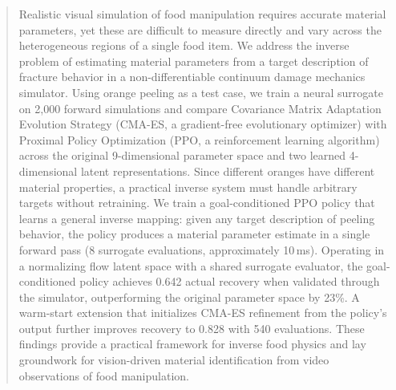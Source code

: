 \begin{abstract}
Realistic visual simulation of food manipulation requires accurate material parameters, yet these are difficult to measure directly and vary across the heterogeneous regions of a single food item.
We address the inverse problem of estimating material parameters from a target description of fracture behavior in a non-differentiable continuum damage mechanics simulator.
Using orange peeling as a test case, we train a neural surrogate on 2,000 forward simulations and compare Covariance Matrix Adaptation Evolution Strategy (CMA-ES, a gradient-free evolutionary optimizer) with Proximal Policy Optimization (PPO, a reinforcement learning algorithm) across the original 9-dimensional parameter space and two learned 4-dimensional latent representations.
Since different oranges have different material properties, a practical inverse system must handle arbitrary targets without retraining. We train a goal-conditioned PPO policy that learns a general inverse mapping: given any target description of peeling behavior, the policy produces a material parameter estimate in a single forward pass (8 surrogate evaluations, approximately 10\,ms).
Operating in a normalizing flow latent space with a shared surrogate evaluator, the goal-conditioned policy achieves 0.642 actual recovery when validated through the simulator, outperforming the original parameter space by 23\%.
A warm-start extension that initializes CMA-ES refinement from the policy's output further improves recovery to 0.828 with 540 evaluations.
These findings provide a practical framework for inverse food physics and lay groundwork for vision-driven material identification from video observations of food manipulation.


\end{abstract}